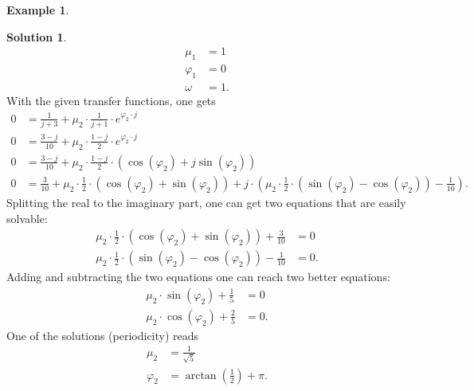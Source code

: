 \documentclass[a4paper,12 pt]{article}
\numberwithin{equation}{section}
\theoremstyle{definition}
\newtheorem{bsp}{Example}
\theoremstyle{remark}
\theoremstyle{definition}
\newtheorem*{lsg}{Solution}
\theoremstyle{definition}
\theoremstyle{definition}
\theoremstyle{remark}
\begin{document}
\begin{bsp}
\begin{lsg}
\begin{equation*}
\begin{split}
\mu_1&=1\\
\varphi_1 &=0\\
\omega&=1.
\end{split}
\end{equation*}
With the given transfer functions, one gets
\begin{equation*}
\begin{split}
0&=\frac{1}{j+3}+\mu_2\cdot \frac{1}{j+1}\cdot e^{\varphi_2 \cdot j}\\
0&=\frac{3-j}{10}+\mu_2\cdot \frac{1-j}{2}\cdot e^{\varphi_2 \cdot j}\\
0&=\frac{3-j}{10}+\mu_2\cdot \frac{1-j}{2}\cdot (\cos(\varphi_2)+j\sin(\varphi_2))\\
0&=\frac{3}{10}+\mu_2\cdot \frac{1}{2} \cdot (\cos(\varphi_2)+\sin(\varphi_2))+j\cdot \left( \mu_2\cdot \frac{1}{2}\cdot (\sin(\varphi_2)-\cos(\varphi_2)) -\frac{1}{10}\right).
\end{split}
\end{equation*}
Splitting the real to the imaginary part, one can get two equations that are easily solvable:
\begin{equation*}
\begin{split}
\mu_2\cdot \frac{1}{2}\cdot (\cos(\varphi_2)+\sin(\varphi_2))+\frac{3}{10}&=0\\
\mu_2\cdot \frac{1}{2}\cdot (\sin(\varphi_2)-\cos(\varphi_2))-\frac{1}{10}&=0.
\end{split}
\end{equation*}
Adding and subtracting the two equations one can reach two better equations:
\begin{equation*}
\begin{split}
\mu_2\cdot \sin(\varphi_2)+\frac{1}{5}&=0\\
\mu_2\cdot \cos(\varphi_2)+\frac{2}{5}&=0.
\end{split}
\end{equation*}
One of the solutions (periodicity) reads
\begin{equation*}
\begin{split}
\mu_2&=\frac{1}{\sqrt{5}}\\
\varphi_2&=\arctan\left( \frac{1}{2} \right)+\pi.
\end{split}
\end{equation*}



\end{lsg}

\end{bsp}
\end{document}
